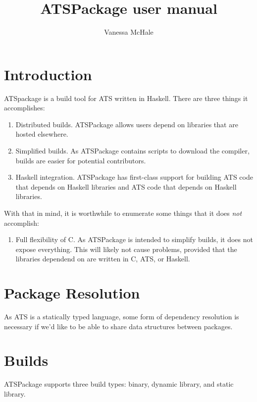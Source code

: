 \documentclass{article}
\begin{document}
\title{ATSPackage user manual}
\author{Vanessa McHale}
\maketitle

\tableofcontents

\section{Introduction}

ATSpackage is a build tool for ATS written in Haskell. There are three
things it accomplishes:

\begin{enumerate}
  \item Distributed builds. ATSPackage allows users depend on libraries that are
    hosted elsewhere.
  \item Simplified builds. As ATSPackage contains scripts to download the
    compiler, builds are easier for potential contributors.
  \item Haskell integration. ATSPackage has first-class support for building ATS
    code that depends on Haskell libraries and ATS code that depends on Haskell
    libraries.
\end{enumerate}

With that in mind, it is worthwhile to enumerate some things that it does
\textit{not} accomplish:

\begin{enumerate}
  \item Full flexibility of C. As ATSPackage is intended to simplify builds, it
    does not expose everything. This will likely not cause problems, provided
    that the libraries dependend on are written in C, ATS, or Haskell.
\end{enumerate}

\section{Package Resolution}

As ATS is a statically typed language, some form of dependency resolution is
necessary if we'd like to be able to share data structures between packages.

\section{Builds}

ATSPackage supports three build types: binary, dynamic library, and static
library.
\end{document}
